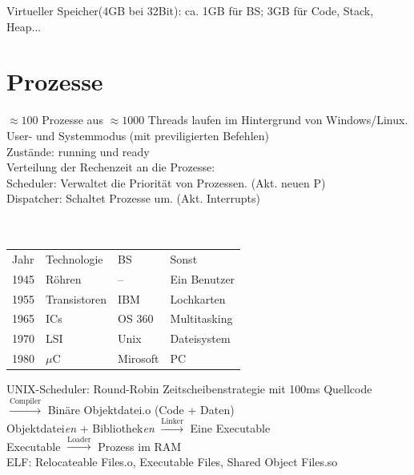 \documentclass[fs]{latex4ei}
\begin{document}
\begin{multicols}{4}
Virtueller Speicher(4GB bei 32Bit): ca. 1GB für BS; 3GB für Code, Stack, Heap...\\ 

\section{Prozesse}
$\approx 100$ Prozesse aus $\approx 1000$ Threads laufen im Hintergrund von Windows/Linux.\\
User- und Systemmodus (mit previligierten Befehlen)\\
Zustände: running und ready\\
Verteilung der Rechenzeit an die Prozesse:\\
Scheduler: Verwaltet die Priorität von Prozessen. (Akt. neuen P)\\
Dispatcher: Schaltet Prozesse um. (Akt. Interrupts)\\
\\
{
\\	
}

\begin{tabular}{llll}
	Jahr & Technologie & BS & Sonst\\
	1945 & Röhren & -- & Ein Benutzer\\
	1955 & Transistoren & IBM & Lochkarten\\
	1965 & ICs	& OS 360 & Multitasking\\
	1970 & LSI & Unix & Dateisystem\\
	1980 & $\mu$C & Mirosoft & PC\\
\end{tabular}



UNIX-Scheduler: Round-Robin Zeitscheibenstrategie mit 100ms
Quellcode $\xrightarrow{\text{Compiler}}$ Binäre Objektdatei.o (Code + Daten)\\
Objektdatei\emph{en} + Bibliothek\emph{en} $\xrightarrow{\text{Linker}}$ Eine Executable\\
Executable $\xrightarrow{\text{Loader}}$ Prozess im RAM\\
ELF: Relocateable Files.o, Executable Files, Shared Object Files.so\\





\end{multicols}
\end{document}
